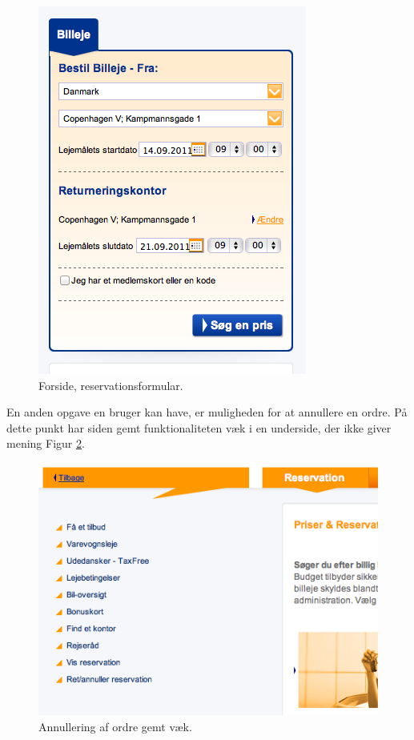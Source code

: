 \documentclass[a4paper]{article}
\begin{document}
\begin{figure}[htbp]
  \begin{center}
    \includegraphics[scale=.6]{1.png}
  \end{center}
  \caption{Forside, reservationsformular.}
  \label{forside}
\end{figure}

En anden opgave en bruger kan have, er muligheden for at annullere en ordre. På
dette punkt har siden gemt funktionaliteten væk i en underside, der ikke giver
mening Figur \ref{annullering}.

\begin{figure}[htbp]
  \begin{center}
    \includegraphics[scale=.6]{3.png}
  \end{center}
  \caption{Annullering af ordre gemt væk.}
  \label{annullering}
\end{figure}
\end{document}
